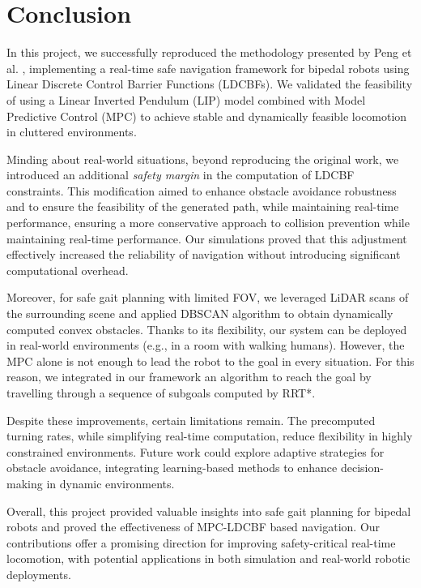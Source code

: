 \section{Conclusion}\label{sec:conclusions}
In this project, we successfully reproduced the methodology presented by Peng et al. \cite{peng_main_paper}, implementing a real-time
safe navigation framework for bipedal robots using Linear Discrete Control Barrier Functions (LDCBFs).
We validated the feasibility of using a Linear Inverted Pendulum (LIP) model combined with Model Predictive Control (MPC) to achieve stable and dynamically feasible locomotion in cluttered environments.

Minding about real-world situations, beyond reproducing the original work, we introduced an additional
\textit{safety margin} in the computation of LDCBF constraints.
This modification aimed to enhance obstacle avoidance robustness and to ensure the feasibility of the generated path, while maintaining
real-time performance, ensuring a more conservative approach to collision prevention while maintaining real-time performance.
Our simulations proved that this adjustment effectively increased the reliability of navigation without
introducing significant computational overhead.

Moreover, for safe gait planning with limited FOV, we leveraged LiDAR scans of the surrounding scene and applied DBSCAN
algorithm to obtain dynamically computed convex obstacles.
Thanks to its flexibility, our system can be deployed in real-world environments (e.g., in a room with walking humans).
However, the MPC alone is not enough to lead the robot to the goal in every situation. For this reason, we integrated in our framework an algorithm to reach the goal by travelling through a sequence of subgoals computed by RRT*.

Despite these improvements, certain limitations remain.
The precomputed turning rates, while simplifying real-time computation, reduce flexibility in highly constrained environments.
Future work could explore adaptive strategies for obstacle avoidance, integrating learning-based methods to enhance decision-making in dynamic environments.

Overall, this project provided valuable insights into safe gait planning for bipedal robots and proved the effectiveness of MPC-LDCBF based navigation.
Our contributions offer a promising direction for improving safety-critical real-time locomotion, with potential applications in both simulation and real-world robotic deployments.